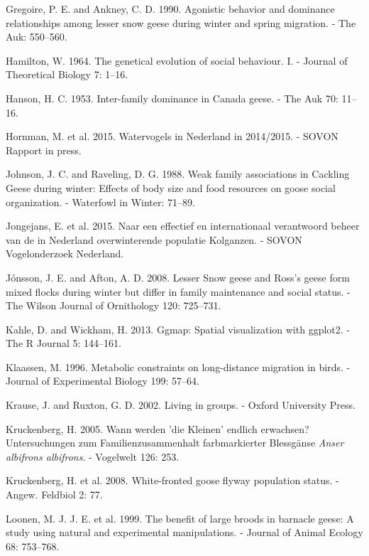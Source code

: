 \documentclass[10pt,twocolumn]{paper}
\begin{document}
\hypertarget{ref-gregoire1990agonistic}{}
Gregoire, P. E. and Ankney, C. D. 1990. Agonistic behavior and dominance
relationships among lesser snow geese during winter and spring
migration. - The Auk: 550--560.

\hypertarget{ref-HAMILTON19641}{}
Hamilton, W. 1964. The genetical evolution of social behaviour. I. -
Journal of Theoretical Biology 7: 1--16.

\hypertarget{ref-hanson1953dominance}{}
Hanson, H. C. 1953. Inter-family dominance in Canada geese. - The Auk
70: 11--16.

\hypertarget{ref-sovon2015watervogels}{}
Hornman, M. et al. 2015. Watervogels in Nederland in 2014/2015. - SOVON
Rapport in press.

\hypertarget{ref-johnson1988weak}{}
Johnson, J. C. and Raveling, D. G. 1988. Weak family associations in
Cackling Geese during winter: Effects of body size and food resources on
goose social organization. - Waterfowl in Winter: 71--89.

\hypertarget{ref-jongejans2015naar}{}
Jongejans, E. et al. 2015. Naar een effectief en internationaal
verantwoord beheer van de in Nederland overwinterende populatie
Kolganzen. - SOVON Vogelonderzoek Nederland.

\hypertarget{ref-jonsson2008lesser}{}
Jónsson, J. E. and Afton, A. D. 2008. Lesser Snow geese and Ross's geese
form mixed flocks during winter but differ in family maintenance and
social status. - The Wilson Journal of Ornithology 120: 725--731.

\hypertarget{ref-ggmap}{}
Kahle, D. and Wickham, H. 2013. Ggmap: Spatial visualization with
ggplot2. - The R Journal 5: 144--161.

\hypertarget{ref-Klaassen57}{}
Klaassen, M. 1996. Metabolic constraints on long-distance migration in
birds. - Journal of Experimental Biology 199: 57--64.

\hypertarget{ref-krause2002living}{}
Krause, J. and Ruxton, G. D. 2002. Living in groups. - Oxford University
Press.

\hypertarget{ref-kruckenberg2005young}{}
Kruckenberg, H. 2005. Wann werden 'die Kleinen' endlich erwachsen?
Untersuchungen zum Familienzusammenhalt farbmarkierter Blessgänse
\emph{Anser albifrons albifrons}. - Vogelwelt 126: 253.

\hypertarget{ref-kruckenberg2008white}{}
Kruckenberg, H. et al. 2008. White-fronted goose flyway population
status. - Angew. Feldbiol 2: 77.

\hypertarget{ref-JANE:JANE325}{}
Loonen, M. J. J. E. et al. 1999. The benefit of large broods in barnacle
geese: A study using natural and experimental manipulations. - Journal
of Animal Ecology 68: 753--768.
\end{document}
